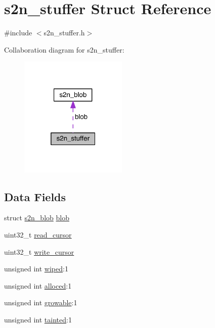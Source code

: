 \hypertarget{structs2n__stuffer}{}\section{s2n\+\_\+stuffer Struct Reference}
\label{structs2n__stuffer}


{\ttfamily \#include $<$s2n\+\_\+stuffer.\+h$>$}



Collaboration diagram for s2n\+\_\+stuffer\+:\nopagebreak
\begin{figure}[H]
\begin{center}
\leavevmode
\includegraphics[width=145pt]{structs2n__stuffer__coll__graph}
\end{center}
\end{figure}
\subsection*{Data Fields}
\begin{DoxyCompactItemize}
\item 
struct \hyperlink{structs2n__blob}{s2n\+\_\+blob} \hyperlink{structs2n__stuffer_ab95f00f583f1cb41ae00918e9ea180c9}{blob}
\item 
uint32\+\_\+t \hyperlink{structs2n__stuffer_a5d643ee7dd6cd0eba779a284dce4a3f6}{read\+\_\+cursor}
\item 
uint32\+\_\+t \hyperlink{structs2n__stuffer_a19d9286958de6627ef95be4d9b9b3d1a}{write\+\_\+cursor}
\item 
unsigned int \hyperlink{structs2n__stuffer_a245e885035adb556e385c8d954b95f5d}{wiped}\+:1
\item 
unsigned int \hyperlink{structs2n__stuffer_abd4e1fb5c5fa93adf354940b4040af52}{alloced}\+:1
\item 
unsigned int \hyperlink{structs2n__stuffer_a93b291fca0ee588e8a23b0f4463febbd}{growable}\+:1
\item 
unsigned int \hyperlink{structs2n__stuffer_aa8988f578e61c3dc7296cee547a3021d}{tainted}\+:1
\end{DoxyCompactItemize}


